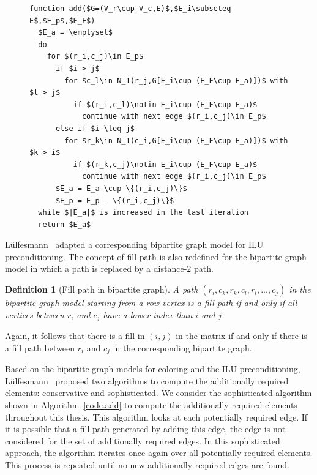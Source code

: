 \documentclass[12pt, twoside,a4paper,toc=bibliography]{scrbook}
\newtheorem{definition}{Definition}
\newcommand{\coderef}[1]{Algorithm~\protect\ref{#1}}
\begin{document}
\begin{figure}
\begin{lstlisting}[caption=Find additionally required elements (based on Algorithm 4.5 from ~\cite{Lulfesmann2012Fap}).,
label=code.add,mathescape]
function add($G=(V_r\cup V_c,E)$,$E_i\subseteq E$,$E_p$,$E_F$)
  $E_a = \emptyset$
  do
    for $(r_i,c_j)\in E_p$
      if $i > j$
        for $c_l\in N_1(r_j,G[E_i\cup (E_F\cup E_a)])$ with $l > j$
          if $(r_i,c_l)\notin E_i\cup (E_F\cup E_a)$
            continue with next edge $(r_i,c_j)\in E_p$
      else if $i \leq j$
        for $r_k\in N_1(c_i,G[E_i\cup (E_F\cup E_a)])$ with $k > i$
          if $(r_k,c_j)\notin E_i\cup (E_F\cup E_a)$
            continue with next edge $(r_i,c_j)\in E_p$
      $E_a = E_a \cup \{(r_i,c_j)\}$
      $E_p = E_p - \{(r_i,c_j)\}$
  while $|E_a|$ is increased in the last iteration
  return $E_a$
\end{lstlisting}
\end{figure}
Lülfesmann~\cite{Lulfesmann2012Fap} adapted a
corresponding bipartite graph model for ILU preconditioning.
The concept of fill path is also redefined for the bipartite graph model
in which a path is replaced by a distance-$2$ path.
\begin{definition}[Fill path in bipartite graph]\label{d.fill.path.bipartite}
A path $(r_i,c_k,r_k,c_l,r_l,...,c_j)$ in the bipartite graph model starting
from a row vertex is a fill path
if and only if all vertices between $r_i$ and $c_j$ have a lower index than $i$
and $j$.
\end{definition}
Again, it follows that
there is a fill-in $(i,j)$ in the matrix if and only if there is a
fill path between $r_i$ and $c_j$ in the corresponding bipartite graph.

Based on the bipartite graph models for coloring and the ILU preconditioning,
Lülfesmann~\cite{Lulfesmann2012Fap} proposed two algorithms to compute the additionally required elements: conservative and sophisticated.
We consider the sophisticated algorithm shown in \coderef{code.add}
to compute the additionally required elements
throughout this thesis. This algorithm looks at each potentially required edge.
If it is possible that a fill path generated by adding this edge,
the edge is not considered for the set of additionally required edges.
In this sophisticated approach, the algorithm iterates once again over
all potentially required elements. This process is repeated until
no new additionally required edges are found.

\end{document}
